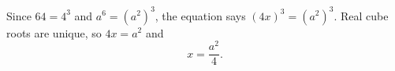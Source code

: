 Since $64=4^3$ and $a^6=(a^2)^3$, the equation says $(4x)^3=(a^2)^3$. Real cube roots are unique, so $4x=a^2$ and
\[
x=\boxed{\dfrac{a^2}{4}}.
\]
